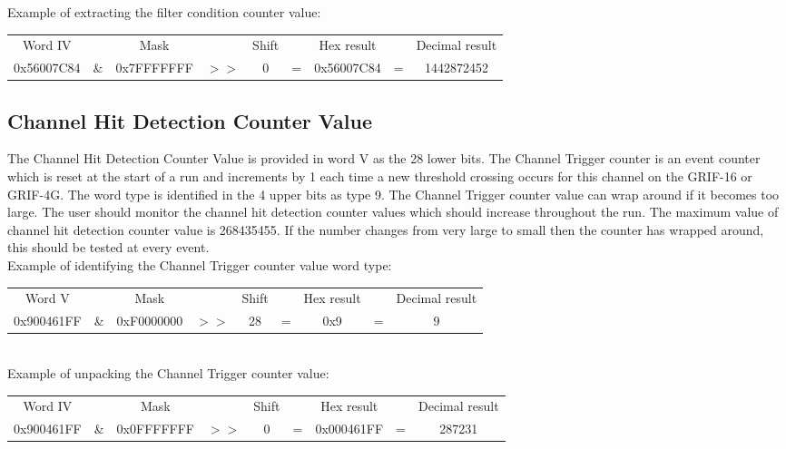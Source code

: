 \documentclass[letterpaper,12pt,notitlepage]{report}
\begin{document}
Example of extracting the filter condition counter value:\\

\begin{tabular}{ccccccccc}
Word IV &  & Mask & & Shift & & Hex result & & Decimal result\\
0x56007C84 & \& & 0x7FFFFFFF & $>>$ & 0 & = & 0x56007C84& = & 1442872452\\
\end{tabular}

\subsection{Channel Hit Detection Counter Value}
The Channel Hit Detection Counter Value is provided in word V as the 28 lower bits. The Channel Trigger counter is an event counter which is reset at the start of a run and increments by 1 each time a new threshold crossing occurs for this channel on the GRIF-16 or GRIF-4G. The word type is identified in the 4 upper bits as type 9. The Channel Trigger counter value can wrap around if it becomes too large. The user should monitor the channel hit detection counter values which should increase throughout the run. The maximum value of channel hit detection counter value is 268435455. If the number changes from very large to small then the counter has wrapped around, this should be tested at every event.\\

Example of identifying the Channel Trigger counter value word type:\\

\begin{tabular}{ccccccccc}
Word V &  & Mask & & Shift & & Hex result & & Decimal result\\
0x900461FF & \& & 0xF0000000 & $>>$ & 28 & = & 0x9 & = & 9\\
\end{tabular}\\

Example of unpacking the Channel Trigger counter value:\\

\begin{tabular}{ccccccccc}
Word IV &  & Mask & & Shift & & Hex result & & Decimal result\\
0x900461FF & \& & 0x0FFFFFFF & $>>$ & 0 & = & 0x000461FF & = & 287231\\
\end{tabular}
\end{document}
